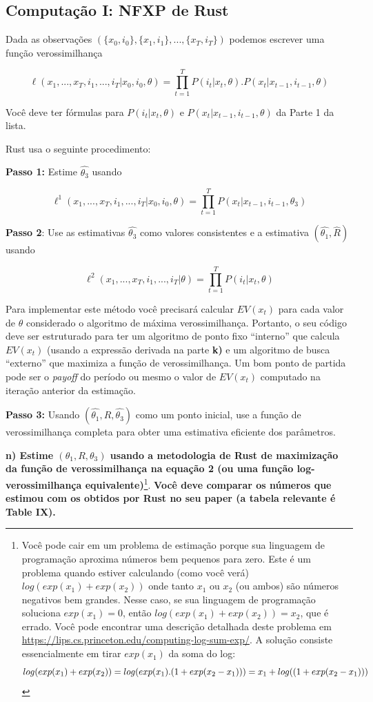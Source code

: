 \documentclass[12pt,a4paper]{article}
\let\rmarkdownfootnote\footnote%
\def\footnote{\protect\rmarkdownfootnote}
\begin{document}
\hypertarget{computacao-i-nfxp-de-rust}{%
\subsection{Computação I: NFXP de
Rust}\label{computacao-i-nfxp-de-rust}}

Dada as observações
\((\{x_0, i_0\},\{x_1,i_1\} , . . . , \{x_T, i_T\})\) podemos escrever
uma função verossimilhança

\[
\ell (x_1,...,x_T,i_1,...,i_T|x_0,i_0,\theta) = \prod_{t=1}^T P(i_t|x_t,\theta).P(x_t|x_{t-1},i_{t-1},\theta)
\label{eq:2}
\]

Você deve ter fórmulas para \(P(i_t|x_t,\theta)\) e
\(P(x_t|x_{t-1},i_{t-1},\theta)\) da Parte 1 da lista.

Rust usa o seguinte procedimento:

\textbf{Passo 1:} Estime \(\hat{\theta_3}\) usando

\[
\ell^1 (x_1,...,x_T,i_1,...,i_T|x_0,i_0,\theta) = \prod_{t=1}^T P(x_t|x_{t-1},i_{t-1},\theta_3)
\]

\textbf{Passo 2}: Use as estimativas \(\hat{\theta_3}\) como valores
consistentes e a estimativa \((\hat{\theta_1},\hat{R})\) usando

\[
\ell^2 (x_1,...,x_T,i_1,...,i_T|\theta)= \prod_{t=1}^T P(i_t|x_t,\theta)
\]

Para implementar este método você precisará calcular \(EV(x_t)\) para
cada valor de \(\theta\) considerado o algoritmo de máxima
verossimilhança. Portanto, o seu código deve ser estruturado para ter um
algoritmo de ponto fixo ``interno'' que calcula \(EV(x_t)\) (usando a
expressão derivada na parte \textbf{k)} e um algoritmo de busca
``externo'' que maximiza a função de verossimilhança. Um bom ponto de
partida pode ser o \emph{payoff} do período ou mesmo o valor de
\(EV(x_t)\) computado na iteração anterior da estimação.

\textbf{Passo 3:} Usando \((\hat{\theta_1},\hat{R},\hat{\theta_3})\)
como um ponto inicial, use a função de verossimilhança completa para
obter uma estimativa eficiente dos parâmetros.

\textbf{n) Estime \((\theta_1, R,\theta_3)\) usando a metodologia de
Rust de maximização da função de verossimilhança na equação 2 (ou uma
função log-verossimilhança equivalente)}\footnote{Você pode cair em um
  problema de estimação porque sua linguagem de programação aproxima
  números bem pequenos para zero. Este é um problema quando estiver
  calculando (como você verá) \(log(exp(x_1) + exp(x_2))\) onde tanto
  \(x_1\) ou \(x_2\) (ou ambos) são números negativos bem grandes. Nesse
  caso, se sua linguagem de programação soluciona \(exp(x_1)= 0\), então
  \(log(exp(x_1) + exp(x_2))=x_2\), que é errado. Você pode encontrar
  uma descrição detalhada deste problema em
  \url{https://lips.cs.princeton.edu/computing-log-sum-exp/}. A solução
  consiste essencialmente em tirar \(exp (x_1)\) da soma do log: \[
  log(exp(x_1) + exp(x_2))= log (exp(x_1).(1 + exp (x_2 - x_1))) \\
  = x_1 + log((1+exp(x_2-x_1)))
  \]}. \textbf{Você deve comparar os números que estimou com os obtidos
por Rust no seu paper (a tabela relevante é Table IX).}
\end{document}
